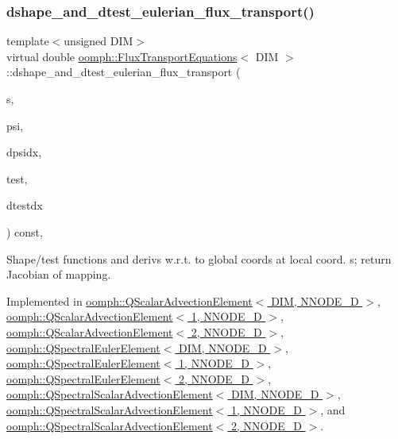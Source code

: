 \subsubsection{\texorpdfstring{dshape\+\_\+and\+\_\+dtest\+\_\+eulerian\+\_\+flux\+\_\+transport()}{dshape\_and\_dtest\_eulerian\_flux\_transport()}}
{\footnotesize\ttfamily template$<$unsigned D\+IM$>$ \\
virtual double \hyperlink{classoomph_1_1FluxTransportEquations}{oomph\+::\+Flux\+Transport\+Equations}$<$ D\+IM $>$\+::dshape\+\_\+and\+\_\+dtest\+\_\+eulerian\+\_\+flux\+\_\+transport (\begin{DoxyParamCaption}\item[{const \hyperlink{classoomph_1_1Vector}{Vector}$<$ double $>$ \&}]{s,  }\item[{\hyperlink{classoomph_1_1Shape}{Shape} \&}]{psi,  }\item[{\hyperlink{classoomph_1_1DShape}{D\+Shape} \&}]{dpsidx,  }\item[{\hyperlink{classoomph_1_1Shape}{Shape} \&}]{test,  }\item[{\hyperlink{classoomph_1_1DShape}{D\+Shape} \&}]{dtestdx }\end{DoxyParamCaption}) const\hspace{0.3cm}{\ttfamily [protected]}, {}}



Shape/test functions and derivs w.\+r.\+t. to global coords at local coord. s; return Jacobian of mapping. 



Implemented in \hyperlink{classoomph_1_1QScalarAdvectionElement_a9fb6d850442888b831a409fb41b7d1be}{oomph\+::\+Q\+Scalar\+Advection\+Element$<$ D\+I\+M, N\+N\+O\+D\+E\+\_\+D $>$}, \hyperlink{classoomph_1_1QScalarAdvectionElement_a9fb6d850442888b831a409fb41b7d1be}{oomph\+::\+Q\+Scalar\+Advection\+Element$<$ 1, N\+N\+O\+D\+E\+\_\+D $>$}, \hyperlink{classoomph_1_1QScalarAdvectionElement_a9fb6d850442888b831a409fb41b7d1be}{oomph\+::\+Q\+Scalar\+Advection\+Element$<$ 2, N\+N\+O\+D\+E\+\_\+D $>$}, \hyperlink{classoomph_1_1QSpectralEulerElement_a1dc148b0c455243d79387ee6399a29df}{oomph\+::\+Q\+Spectral\+Euler\+Element$<$ D\+I\+M, N\+N\+O\+D\+E\+\_\+D $>$}, \hyperlink{classoomph_1_1QSpectralEulerElement_a1dc148b0c455243d79387ee6399a29df}{oomph\+::\+Q\+Spectral\+Euler\+Element$<$ 1, N\+N\+O\+D\+E\+\_\+D $>$}, \hyperlink{classoomph_1_1QSpectralEulerElement_a1dc148b0c455243d79387ee6399a29df}{oomph\+::\+Q\+Spectral\+Euler\+Element$<$ 2, N\+N\+O\+D\+E\+\_\+D $>$}, \hyperlink{classoomph_1_1QSpectralScalarAdvectionElement_a6cc8f352ebe569b0251345aa6e312729}{oomph\+::\+Q\+Spectral\+Scalar\+Advection\+Element$<$ D\+I\+M, N\+N\+O\+D\+E\+\_\+D $>$}, \hyperlink{classoomph_1_1QSpectralScalarAdvectionElement_a6cc8f352ebe569b0251345aa6e312729}{oomph\+::\+Q\+Spectral\+Scalar\+Advection\+Element$<$ 1, N\+N\+O\+D\+E\+\_\+D $>$}, and \hyperlink{classoomph_1_1QSpectralScalarAdvectionElement_a6cc8f352ebe569b0251345aa6e312729}{oomph\+::\+Q\+Spectral\+Scalar\+Advection\+Element$<$ 2, N\+N\+O\+D\+E\+\_\+D $>$}.



